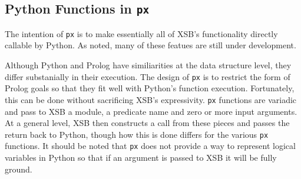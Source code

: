 
%
%

\subsection{Python Functions in {\tt px}}

The intention of {\tt px} is to make essentially all of XSB's
functionality directly callable by Python.  As noted, many of these
featues are still under development.

Although Python and Prolog have similiarities at the data structure
level, they differ substanially in their execution.  The design of
{\tt px} is to restrict the form of Prolog goals so that they fit well
with Python's function execution.  Fortunately, this can be done
without sacrificing XSB's expressivity.  {\tt px} functions are
variadic and pass to XSB a module, a predicate name and zero or more
input arguments.  At a general level, XSB then constructs a call from
these pieces and passes the return back to Python, though how this is
done differs for the various {\tt px} functions.  It should be noted
that {\tt px} does not provide a way to represent logical variables in
Python so that if an argument is passed to XSB it will be fully
ground.

